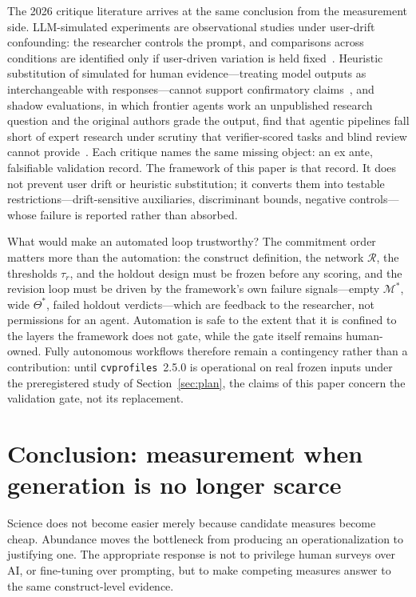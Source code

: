 \documentclass[10pt,letterpaper]{article}
\newcommand{\cvp}{\texttt{cvprofiles}}
\newcommand{\M}{\ensuremath{\mathcal{M}}}
\newcommand{\Rset}{\mathcal{R}}
\begin{document}
The 2026 critique literature arrives at the same conclusion from the measurement side.
LLM-simulated experiments are observational studies under user-drift confounding: the researcher controls the prompt, and comparisons across conditions are identified only if user-driven variation is held fixed~\cite{illusion2026}.
Heuristic substitution of simulated for human evidence---treating model outputs as interchangeable with responses---cannot support confirmatory claims~\cite{hullman2026},
and shadow evaluations, in which frontier agents work an unpublished research question and the original authors grade the output, find that agentic pipelines fall short of expert research under scrutiny that verifier-scored tasks and blind review cannot provide~\cite{kirgis2026}.
Each critique names the same missing object: an ex ante, falsifiable validation record.
The framework of this paper is that record.
It does not prevent user drift or heuristic substitution; it converts them into testable restrictions---drift-sensitive auxiliaries, discriminant bounds, negative controls---whose failure is reported rather than absorbed.

What would make an automated loop trustworthy?
The commitment order matters more than the automation: the construct definition, the network $\Rset$, the thresholds $\tau_r$, and the holdout design must be frozen before any scoring, and the revision loop must be driven by the framework's own failure signals---empty $\M^*$, wide $\Theta^*$, failed holdout verdicts---which are feedback to the researcher, not permissions for an agent.
Automation is safe to the extent that it is confined to the layers the framework does not gate, while the gate itself remains human-owned.
Fully autonomous workflows therefore remain a contingency rather than a contribution: until \cvp{}~2.5.0 is operational on real frozen inputs under the preregistered study of Section~\ref{sec:plan}, the claims of this paper concern the validation gate, not its replacement.

\section{Conclusion: measurement when generation is no longer scarce}
Science does not become easier merely because candidate measures become cheap.
Abundance moves the bottleneck from producing an operationalization to justifying one.
The appropriate response is not to privilege human surveys over AI, or fine-tuning over prompting, but to make competing measures answer to the same construct-level evidence.
\end{document}
